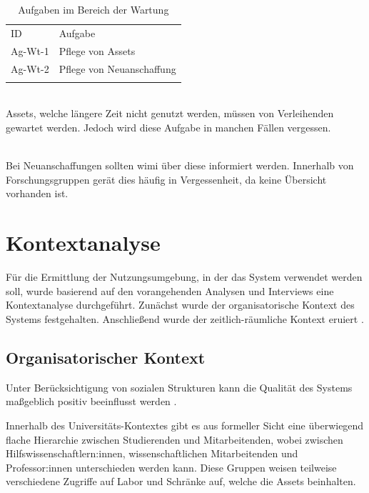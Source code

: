 \begin{table}[h]
        \centering
        \caption{Aufgaben im Bereich der Wartung}
        \begin{tabular}{ll}
                \arrayrulecolor{maincolor}\hline
                \sffamily\color{maincolor}ID & \sffamily\color{maincolor}Aufgabe
                \\
                \arrayrulecolor{maincolor}\hline
                Ag-Wt-1                      & Pflege von Assets
                \\
                Ag-Wt-2                      & Pflege von Neuanschaffung
                \\
                \arrayrulecolor{maincolor}\hline
        \end{tabular}
        \label{table:Ag-Wt}
\end{table}

{\sffamily\color{maincolor}{Ag-Wt-1 | Pflege von Assets}}\\
Assets, welche längere Zeit nicht genutzt werden, müssen von Verleihenden
gewartet werden. Jedoch wird diese Aufgabe in manchen Fällen vergessen.

        {\sffamily\color{maincolor}{Ag-Wt-2 | Pflege von Assets}} \\
Bei Neuanschaffungen sollten \ac{wimi} über diese informiert werden. Innerhalb
von Forschungsgruppen gerät dies häufig in Vergessenheit, da keine Übersicht
vorhanden ist.

\section{Kontextanalyse}
\label{section:kontext}

Für die Ermittlung der Nutzungsumgebung, in der das System verwendet werden
soll, wurde basierend auf den vorangehenden Analysen und Interviews eine
Kontextanalyse durchgeführt. Zunächst wurde der organisatorische Kontext des
Systems festgehalten. Anschließend wurde der zeitlich-räumliche Kontext eruiert
\cite{HerczegSoftEg2018}.

\subsection{Organisatorischer Kontext}
Unter Berücksichtigung von sozialen Strukturen kann die Qualität des Systems
maßgeblich positiv beeinflusst werden \cite{HerczegSoftEg2018}.

Innerhalb des Universitäts-Kontextes gibt es aus formeller Sicht eine
überwiegend flache Hierarchie zwischen Studierenden und Mitarbeitenden, wobei
zwischen Hilfswissenschaftlern:innen, wissenschaftlichen Mitarbeitenden und
Professor:innen unterschieden werden kann. Diese Gruppen weisen teilweise
verschiedene Zugriffe auf Labor und Schränke auf, welche die Assets beinhalten.

